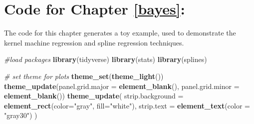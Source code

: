 \documentclass[12pt, twoside]{amherstthesis}
\newenvironment{Shaded}{\begin{snugshade}}{\end{snugshade}}
\newcommand{\AttributeTok}[1]{\textcolor[rgb]{0.13,0.29,0.53}{#1}}
\newcommand{\CommentTok}[1]{\textcolor[rgb]{0.56,0.35,0.01}{\textit{#1}}}
\newcommand{\FunctionTok}[1]{\textcolor[rgb]{0.13,0.29,0.53}{\textbf{#1}}}
\newcommand{\NormalTok}[1]{#1}
\newcommand{\StringTok}[1]{\textcolor[rgb]{0.31,0.60,0.02}{#1}}
\begin{document}
\hypertarget{code-for-chapter-refbayes}{%
\section{Code for Chapter \ref{bayes}:}\label{code-for-chapter-refbayes}}

The code for this chapter generates a toy example, used to demonstrate the kernel machine regression and spline regression techniques.

\scriptsize
\begin{Shaded}
\begin{Highlighting}[]
\CommentTok{\#load packages}
\FunctionTok{library}\NormalTok{(tidyverse)}
\FunctionTok{library}\NormalTok{(stats)}
\FunctionTok{library}\NormalTok{(splines)}
\end{Highlighting}
\end{Shaded}
\normalsize

\scriptsize
\begin{Shaded}
\begin{Highlighting}[]
\CommentTok{\# set theme for plots}
\FunctionTok{theme\_set}\NormalTok{(}\FunctionTok{theme\_light}\NormalTok{())}
\FunctionTok{theme\_update}\NormalTok{(}\AttributeTok{panel.grid.major =} \FunctionTok{element\_blank}\NormalTok{(), }
             \AttributeTok{panel.grid.minor =} \FunctionTok{element\_blank}\NormalTok{())}
\FunctionTok{theme\_update}\NormalTok{(}
  \AttributeTok{strip.background =} \FunctionTok{element\_rect}\NormalTok{(}\AttributeTok{color=}\StringTok{"gray"}\NormalTok{, }\AttributeTok{fill=}\StringTok{"white"}\NormalTok{), }
  \AttributeTok{strip.text =} \FunctionTok{element\_text}\NormalTok{(}\AttributeTok{color =} \StringTok{"gray30"}\NormalTok{)}
\NormalTok{  )}
\end{Highlighting}
\end{Shaded}
\normalsize
\end{document}

